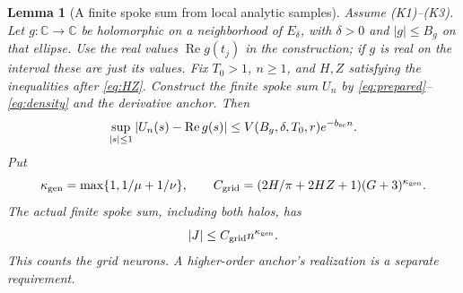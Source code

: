 \documentclass[11pt,letterpaper]{article}
\newcommand{\C}{\mathbb C}
\newtheorem{lemma}{Lemma}[section]
\theoremstyle{definition}
\theoremstyle{remark}
\begin{document}
\begin{lemma}[A finite spoke sum from local analytic samples]\label{thm:scalar}
Assume (K1)--(K3). Let \(g:\C\to\C\) be holomorphic on a neighborhood of
\(E_\delta\), with \(\delta>0\) and \(|g|\le B_g\) on that ellipse.
Use the real values \(\operatorname{Re}g(t_j)\) in the construction;
if \(g\) is real on the interval these are just its values.
Fix \(T_0>1\), \(n\ge1\), and \(H,Z\) satisfying the inequalities after
\eqref{eq:HZ}. Construct the finite spoke sum \(U_n\) by
\eqref{eq:prepared}--\eqref{eq:density} and the derivative anchor.
Then
\begin{equation}\label{eq:scalar-error}
 \sup_{|s|\le1}|U_n(s)-\operatorname{Re}g(s)|
 \le V(B_g,\delta,T_0,r)e^{-b_{\rm sc}n}.
\end{equation}
Put
\[
 \kappa_{\rm gen}=\max\{1,1/\mu+1/\nu\},\qquad
 C_{\rm grid}=(2H/\pi+2HZ+1)(G+3)^{\kappa_{\rm gen}}.
\]
The actual finite spoke sum, including both halos, has
\begin{equation}\label{eq:row-width}
 |J|\le C_{\rm grid}n^{\kappa_{\rm gen}}.
\end{equation}
This counts the grid neurons. A higher-order anchor's realization is a
separate requirement.
\end{lemma}
\end{document}
